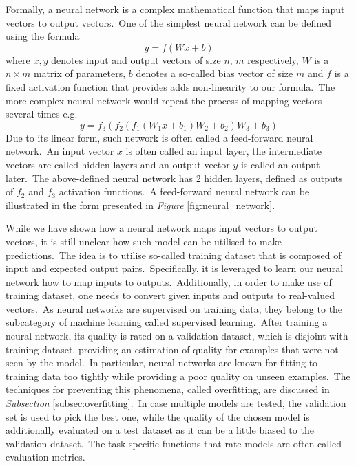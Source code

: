 \documentclass[longabstract, english, mgr]{iithesis}
\theoremstyle{default_theorem_style}\newtheorem{theorem}{Theorem}
\theoremstyle{default_theorem_style}\newtheorem{definition}{Definition}
\begin{document}
\noindent Formally, a neural network is a complex mathematical function that maps input vectors to output
vectors.\ One of the simplest neural network can be defined using the formula
\begin{equation}\label{eq:one_layer_network}
y = f(W x + b)
\end{equation}
where $x, y$ denotes input and output vectors of size $n$, $m$ respectively, $W$ is a $n \times m$ matrix of
parameters, $b$ denotes a so-called bias vector of size $m$ and $f$ is a fixed activation function that provides
adds non-linearity to our formula.\ The more complex neural network would repeat the process of mapping vectors several
times e.g.
\begin{equation}\label{eq:multi_layer_network}
y = f_3(f_2(f_1(W_1 x + b_1) W_2 + b_2) W_3 + b_3)
\end{equation}
Due to its linear form, such network is often called a feed-forward neural network.\ An input vector $x$ is often
called an input layer, the intermediate vectors are called hidden layers and an output vector $y$ is called
an output later.\ The above-defined neural network has 2 hidden layers, defined as outputs of $f_2$ and $f_3$
activation functions.\ A feed-forward neural network can be illustrated in the form presented in
\textit{Figure} \ref{fig:neural_network}.\newline

\noindent While we have shown how a neural network maps input vectors to output vectors, it is still unclear how such
model can be utilised to make predictions.\ The idea is to utilise so-called training dataset that is composed of
input and expected output pairs.\ Specifically, it is leveraged to learn our neural network how to map inputs to
outputs.\ Additionally, in order to make use of training dataset, one needs to convert given inputs and outputs
to real-valued vectors.\ As neural networks are supervised on training data, they belong to the subcategory of machine
learning called supervised learning.\ After training a neural network, its quality is rated on a validation dataset,
which is disjoint with training dataset, providing an estimation of quality for examples that were not seen by the
model.\ In particular, neural networks are known for fitting to training data too tightly while providing a poor
quality on unseen examples.\ The techniques for preventing this phenomena, called overfitting, are discussed in
\textit{Subsection} \ref{subsec:overfitting}.\ In case multiple models are tested, the validation set is used to pick
the best one, while the quality of the chosen model is additionally evaluated on a test dataset as it can be a little
biased to the validation dataset.\ The task-specific functions that rate models are often called
evaluation metrics.\newline
\end{document}
